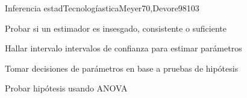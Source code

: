 \begin{syllabus}
\begin{unit}{Inferencia estadTecnologíastica}{}{Meyer70,Devore98}{10}{3}
   \begin{learningoutcomes}
      \item Probar si un estimador es insesgado, consistente o suficiente
      \item Hallar intervalo intervalos de confianza para estimar parámetros
      \item Tomar decisiones de parámetros en base a pruebas de hipótesis
      \item Probar hipótesis usando ANOVA
   \end{learningoutcomes}
\end{unit}



\begin{coursebibliography}
\end{coursebibliography}

\end{syllabus}
